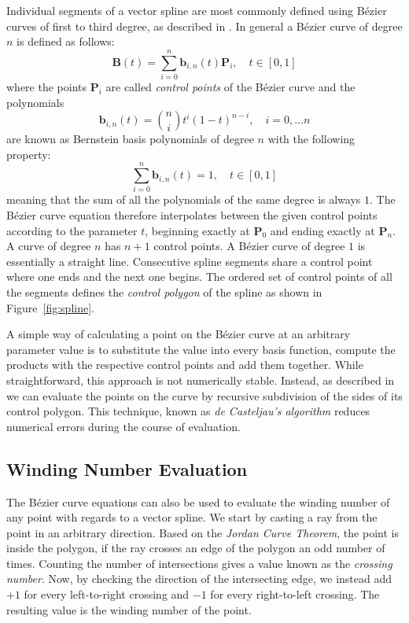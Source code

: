 \documentclass[11pt,a4paper,twoside]{article}
\begin{document}
Individual segments of a vector spline are most commonly defined using B\'{e}zier curves of first to third degree, as described in \cite{Farin02}. In general a B\'{e}zier curve of degree $n$ is defined as follows:
\[ \mathbf{B}(t) = \sum_{i=0}^{n} \mathbf{b}_{i,n}(t)\mathbf{P}_i, \quad t \in [0, 1] \]
where the points $\mathbf{P}_i$ are called \emph{control points} of the B\'{e}zier curve and the polynomials
\[ \mathbf{b}_{i,n}(t) = \binom{n}{i} t^i (1 - t)^{n-i}, \quad i = 0, ... n \]
are known as Bernstein basis polynomials of degree $n$ with the following property:
\[ \sum_{i=0}^{n} \mathbf{b}_{i,n}(t) = 1, \quad t \in [0, 1] \]
meaning that the sum of all the polynomials of the same degree is always $1$. The B\'{e}zier curve equation therefore interpolates between the given control points according to the parameter $t$, beginning exactly at $\mathbf{P}_0$ and ending exactly at $\mathbf{P}_n$. A curve of degree $n$ has $n+1$ control points. A  B\'{e}zier curve of degree $1$ is essentially a straight line. Consecutive spline segments share a control point where one ends and the next one begins. The ordered set of control points of all the segments defines the \emph{control polygon} of the spline as shown in Figure~\ref{fig:spline}.

A simple way of calculating a point on the  B\'{e}zier curve at an arbitrary parameter value is to substitute the value into every basis function, compute the products with the respective control points and add them together. While straightforward, this approach is not numerically stable. Instead, as described in \cite{Boehm99} we can evaluate the points on the curve by recursive subdivision of the sides of its control polygon. This technique, known as \emph{de Casteljau's algorithm} reduces numerical errors during the course of evaluation.

\subsection{Winding Number Evaluation}
\label{sec:winding}

The B\'{e}zier curve equations can also be used to evaluate the winding number of any point with regards to a vector spline. We start by casting a ray from the point in an arbitrary direction. Based on the \emph{Jordan Curve Theorem}, the point is inside the polygon, if the ray crosses an edge of the polygon an odd number of times. Counting the number of intersections gives a value known as the \emph{crossing number}. Now, by checking the direction of the intersecting edge, we instead add $+1$ for every left-to-right crossing and $-1$ for every right-to-left crossing. The resulting value is the winding number of the point.
\end{document}

